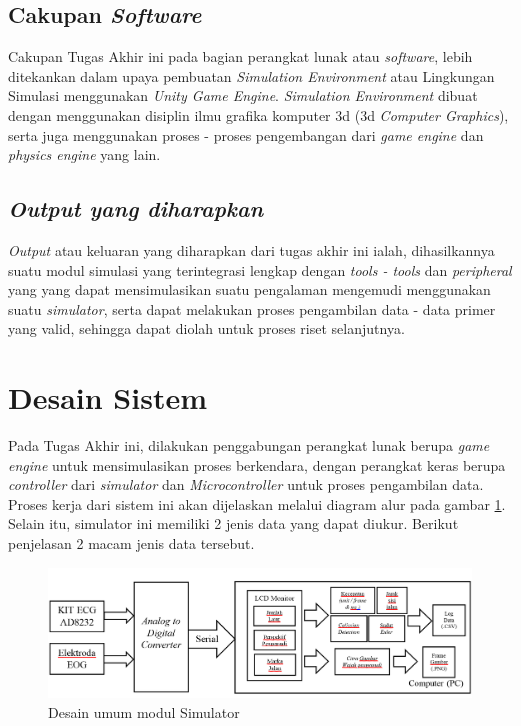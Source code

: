     \subsection{Cakupan \textit{Software}}
   Cakupan Tugas Akhir ini pada bagian perangkat lunak atau \textit{software}, lebih ditekankan dalam upaya pembuatan \textit{Simulation Environment} atau Lingkungan Simulasi menggunakan \textit{Unity Game Engine}. \textit{Simulation Environment} dibuat dengan menggunakan disiplin ilmu grafika komputer 3d (3d \textit{Computer Graphics}), serta juga menggunakan proses - proses pengembangan dari \textit{game engine} dan \textit{physics engine} yang lain.
    
    \subsection{\textit{Output yang diharapkan}}
    \textit{Output} atau keluaran yang diharapkan dari tugas akhir ini ialah, dihasilkannya suatu modul simulasi yang terintegrasi lengkap dengan \textit{tools - tools} dan \textit{peripheral} yang yang dapat mensimulasikan suatu pengalaman mengemudi menggunakan suatu \textit{simulator}, serta dapat melakukan proses pengambilan data - data primer yang valid, sehingga dapat diolah untuk proses riset selanjutnya.


\section{Desain Sistem}
\vspace{1ex}
	Pada Tugas Akhir ini, dilakukan penggabungan perangkat lunak berupa \textit{game engine} untuk mensimulasikan proses berkendara, dengan perangkat keras berupa \textit{controller} dari \textit{simulator} dan \textit{Microcontroller} untuk proses pengambilan data. Proses kerja dari sistem ini akan dijelaskan melalui diagram alur pada gambar \ref{fig: 3_2}.
	Selain itu, simulator ini memiliki 2 jenis data yang dapat diukur. Berikut penjelasan 2 macam jenis data tersebut.
\begin{figure}  [!htb]
	\captionsetup{justification=centering}
	\includegraphics[scale=0.25]{img/desainsistem.PNG}
	\caption{Desain umum modul Simulator}
	\label{fig: 3_2}
\end{figure}
\vspace{1ex}

